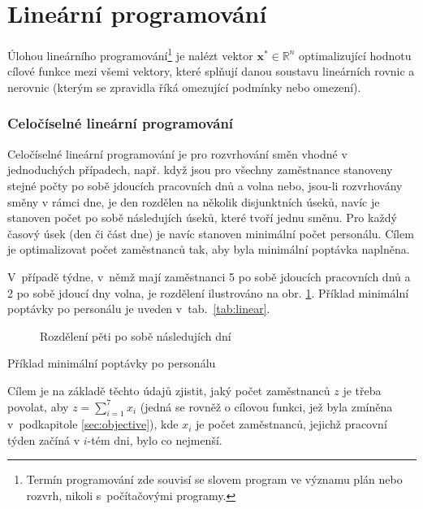 \documentclass[twoside]{ctuthesis}
\begin{document}
\section{Lineární programování}
Úlohou lineárního programování\footnote{Termín programování zde souvisí se slovem program ve významu plán nebo rozvrh, nikoli s~počítačovými programy. } je nalézt vektor $\boldsymbol{x}^{\ast} \in \mathbb{R}^n$ optimalizující hodnotu cílové funkce mezi všemi vektory, které splňují danou soustavu lineárních rovnic a nerovnic (kterým se zpravidla říká omezující podmínky nebo omezení). \cite{matousek2006linearni}

\subsubsection{Celočíselné lineární programování}

Celočíselné lineární programování je pro rozvrhování směn vhodné v jed\-no\-du\-chých případech, např. když jsou pro všechny zaměstnance stanoveny stejné počty po sobě jdoucích pracovních dnů a volna nebo, jsou-li rozvrhovány směny v rámci dne, je den rozdělen na několik disjunktních úseků, navíc je stanoven počet po sobě následujích úseků, které tvoří jednu směnu. Pro každý časový úsek (den či část dne) je navíc stanoven minimální počet personálu. \cite{satheeshkumar2014linear} Cílem je optimalizovat počet zaměstnanců tak, aby byla minimální poptávka naplněna.

V~případě týdne, v~němž mají zaměstnanci 5 po sobě jdoucích pracovních dnů a 2 po sobě jdoucí dny volna, je rozdělení ilustrováno na obr. \ref{fig:linear}. Příklad minimální poptávky po personálu je uveden v~tab.~\ref{tab:linear}.

\begin{figure}[h]
	
	\caption{Rozdělení pěti po sobě následujích dní}
	\label{fig:linear}
\end{figure}

\begin{table}[h]
	
	\caption{Příklad minimální poptávky po personálu}
	\label{tab:linear}
\end{table}

Cílem je na základě těchto údajů zjistit, jaký počet zaměstnanců $z$ je třeba povolat, aby $z = \sum_{i=1}^{7} x_i$ (jedná se rovněž o cílovou funkci, jež byla zmíněna v~podkapitole \ref{sec:objective}), kde $x_i$ je počet zaměstnanců, jejichž pracovní týden začíná v $i$-tém dni, bylo co nejmenší.
\end{document}
